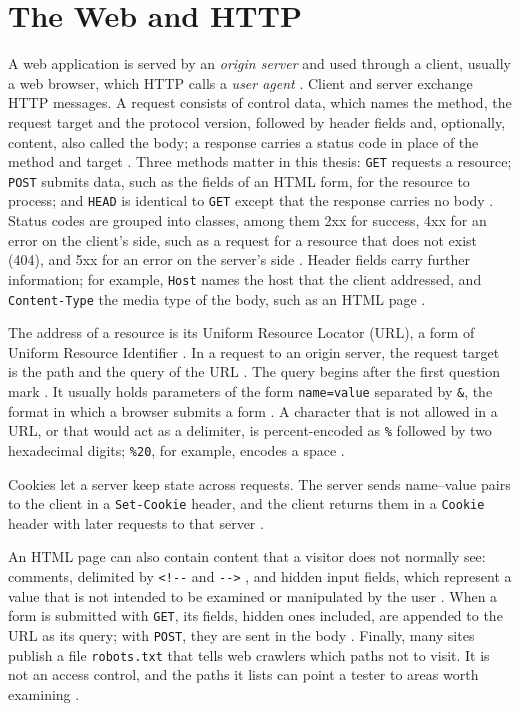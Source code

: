 \documentclass{rptuma}
\begin{document}
\section{The Web and HTTP}
\label{sec:bg.web}

A web application is served by an \emph{origin server} and used through a client, usually a web
browser, which HTTP calls a \emph{user agent} \cite{rfc9110}. Client and server exchange HTTP
messages. A request consists of control data, which names the method, the request target and the
protocol version, followed by header fields and, optionally, content, also called the body; a
response carries a status code in place of the method and target \cite{rfc9110}. Three methods
matter in this thesis: \texttt{GET} requests a resource; \texttt{POST} submits data, such as the
fields of an HTML form, for the resource to process; and \texttt{HEAD} is identical to \texttt{GET}
except that the response carries no body \cite{rfc9110}. Status codes are grouped into classes,
among them 2xx for success, 4xx for an error on the client's side, such as a request for a
resource that does not exist (404), and 5xx for an error on the server's side \cite{rfc9110}.
Header fields carry further information; for example, \texttt{Host} names the host that the client
addressed, and \texttt{Content-Type} the media type of the body, such as an HTML page
\cite{rfc9110}.

The address of a resource is its Uniform Resource Locator (URL), a form of Uniform Resource
Identifier \cite{rfc3986}. In a request to an origin server, the request target is the path and the
query of the URL \cite{rfc9112}. The query begins after the first question mark \cite{rfc3986}. It usually holds parameters of the form
\texttt{name=value} separated by \texttt{\&}, the format in which a browser submits a form
\cite{whatwg_forms}. A character that is not allowed in a URL, or that would act as a delimiter, is
percent-encoded as \texttt{\%} followed by two hexadecimal digits; \texttt{\%20}, for example,
encodes a space \cite{rfc3986}.

Cookies let a server keep state across requests. The server sends name--value pairs to the client
in a \texttt{Set-Cookie} header, and the client returns them in a \texttt{Cookie} header with later
requests to that server \cite{rfc6265}.

An HTML page can also contain content that a visitor does not normally see: comments, delimited by
\texttt{<!-{}-} and \texttt{-{}->} \cite{whatwg_syntax}, and hidden input fields, which represent a
value that is not intended to be examined or manipulated by the user \cite{whatwg_input}. When a
form is submitted with \texttt{GET}, its fields, hidden ones included, are appended to the URL as
its query; with \texttt{POST}, they are sent in the body \cite{whatwg_forms}. Finally, many sites
publish a file \texttt{robots.txt} that tells web crawlers which paths not to visit. It is not an
access control, and the paths it lists can point a tester to areas worth examining
\cite{owasp2020wstg}.
\end{document}

